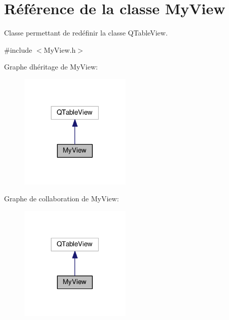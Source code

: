 \hypertarget{class_my_view}{}\section{Référence de la classe My\+View}
\label{class_my_view}


Classe permettant de redéfinir la classe Q\+Table\+View.  




{\ttfamily \#include $<$My\+View.\+h$>$}



Graphe d\textquotesingle{}héritage de My\+View\+:\nopagebreak
\begin{figure}[H]
\begin{center}
\leavevmode
\includegraphics[width=150pt]{class_my_view__inherit__graph}
\end{center}
\end{figure}


Graphe de collaboration de My\+View\+:\nopagebreak
\begin{figure}[H]
\begin{center}
\leavevmode
\includegraphics[width=150pt]{class_my_view__coll__graph}
\end{center}
\end{figure}

